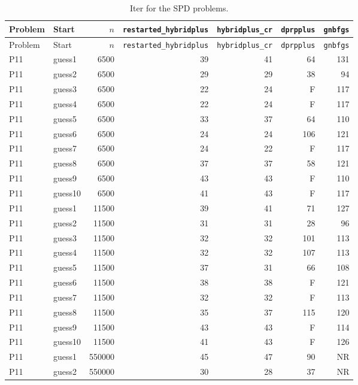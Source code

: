 {\footnotesize
\begin{longtable}{llrrrrr}
\caption{Iter for the SPD problems.}\label{tab:spd_iterations}\\
\toprule Problem & Start & $n$ & \texttt{restarted\_hybridplus} & \texttt{hybridplus\_cr} & \texttt{dprpplus} & \texttt{gnbfgs} \\
\midrule
\endfirsthead
\toprule Problem & Start & $n$ & \texttt{restarted\_hybridplus} & \texttt{hybridplus\_cr} & \texttt{dprpplus} & \texttt{gnbfgs} \\
\midrule
\endhead
\bottomrule
\endfoot
P11 & guess1 & 6500 & 39 & 41 & 64 & 131 \\
P11 & guess2 & 6500 & 29 & 29 & 38 & 94 \\
P11 & guess3 & 6500 & 22 & 24 & F & 117 \\
P11 & guess4 & 6500 & 22 & 24 & F & 117 \\
P11 & guess5 & 6500 & 33 & 37 & 64 & 110 \\
P11 & guess6 & 6500 & 24 & 24 & 106 & 121 \\
P11 & guess7 & 6500 & 24 & 22 & F & 117 \\
P11 & guess8 & 6500 & 37 & 37 & 58 & 121 \\
P11 & guess9 & 6500 & 43 & 43 & F & 110 \\
P11 & guess10 & 6500 & 41 & 43 & F & 117 \\
P11 & guess1 & 11500 & 39 & 41 & 71 & 127 \\
P11 & guess2 & 11500 & 31 & 31 & 28 & 96 \\
P11 & guess3 & 11500 & 32 & 32 & 101 & 113 \\
P11 & guess4 & 11500 & 32 & 32 & 107 & 113 \\
P11 & guess5 & 11500 & 37 & 31 & 66 & 108 \\
P11 & guess6 & 11500 & 38 & 38 & F & 121 \\
P11 & guess7 & 11500 & 32 & 32 & F & 113 \\
P11 & guess8 & 11500 & 35 & 37 & 115 & 120 \\
P11 & guess9 & 11500 & 43 & 43 & F & 114 \\
P11 & guess10 & 11500 & 41 & 43 & F & 126 \\
P11 & guess1 & 550000 & 45 & 47 & 90 & NR \\
P11 & guess2 & 550000 & 30 & 28 & 37 & NR \\

\end{longtable}}
